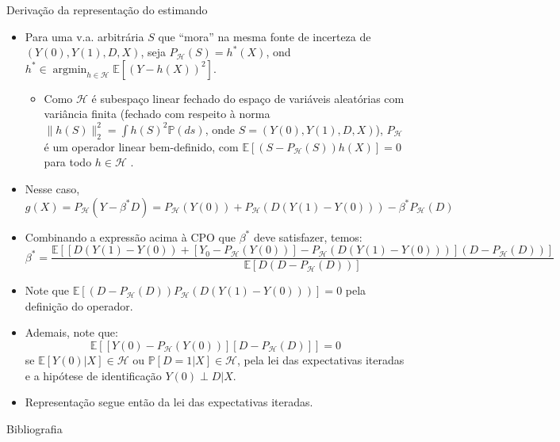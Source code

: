 \documentclass[11pt]{beamer}
\begin{document}
\begin{frame}{Derivação da representação do estimando}
		\label{proof_angrist}
		\scriptsize 
	\begin{itemize}
\item Para uma v.a. arbitrária $S$ que ``mora'' na mesma fonte de incerteza de $(Y(0),Y(1),D,X)$, seja $P_{\mathcal{H}}(S) = h^*(X)$, ond $h^* \in \operatorname{argmin}_{h \in \mathcal{H}} \mathbb{E}[(Y-h(X))^2]$.
\begin{itemize}
	\scriptsize 
	\item Como $\mathcal{H}$ é subespaço linear fechado do espaço de variáveis aleatórias com variância finita (fechado com respeito à norma $\lVert h(S) \rVert_2^2 = \int h(S)^2\mathbb{P}(ds)$, onde $S=(Y(0),Y(1),D,X)$), $P_{\mathcal{H}}$ é um operador linear bem-definido, com $\mathbb{E}[(S-P_{\mathcal{H}}(S))h(X)] = 0$ para todo $h \in \mathcal{H}$ \citep[ver Seções 3.2 e 3.3 de][para detalhes]{ kreyszig1991introductory}.
\end{itemize}
\item Nesse caso, $g(X) = P_{\mathcal{H}}(Y- \beta^* D) = P_{\mathcal{H}}(Y(0)) + P_{\mathcal{H}}(D(Y(1)-Y(0))) -\beta^*  P_{\mathcal{H}}(D)$
\item Combinando a expressão acima à CPO que $\beta^*$ deve satisfazer, temos:
{
$$ \beta^* = \frac{\mathbb{E}[[ D(Y(1)-Y(0)) + [Y_0 - P_{\mathcal{H}}(Y(0))] - P_{\mathcal{H}}(D(Y(1)-Y(0)))  ](D-P_{\mathcal{H}}(D)) ]}{\mathbb{E}[D(D-P_{\mathcal{H}}(D))]}$$}
\item Note que $\mathbb{E}[(D-P_{\mathcal{H}}(D))  P_{\mathcal{H}}(D(Y(1)-Y(0)))] = 0$ pela definição do operador. \item Ademais, note que: 
$$\mathbb{E}[ [Y(0) - P_{\mathcal{H}}(Y(0))][D-P_{\mathcal{H}}(D)] ]=0$$
se $\mathbb{E}[Y(0)|X] \in \mathcal{H}$  ou $\mathbb{P}[D=1|X] \in \mathcal{H}$, pela lei das expectativas iteradas e a hipótese de identificação $Y(0) \perp D |X$.
\item Representação segue então da lei das expectativas iteradas.
		\hyperlink{main}{}
	\end{itemize}
\end{frame}
\begin{frame}[allowframebreaks]{Bibliografia}
	\printbibliography
	
\end{frame}
\end{document}
